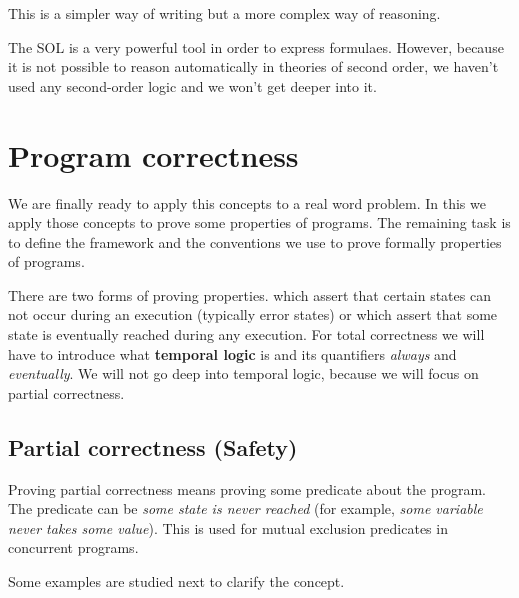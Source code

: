 This is a simpler way of writing but a more complex way of reasoning.

The \gls{SOL} is a very powerful tool in order to express formulaes. 
%
However, because it is not possible to reason automatically in theories of second order, we haven't used any second-order logic and we won't get deeper into it. 



\section{Program correctness}

We are finally ready to apply this concepts to a real word problem. In this \thisworkm we apply those concepts to prove some properties of programs.
%
The remaining task is to define the framework and the conventions we use to prove formally properties of programs.

There are two forms of proving properties. 
%
 which assert that certain states can not occur during an execution (typically error states) or 
 which assert that some state is eventually reached during any execution. 
%
For total correctness we will have to introduce what \textbf{temporal logic} is and its quantifiers \textit{always} and \textit{eventually}. 
%
We will not go deep into temporal logic, because we will focus on partial correctness.




\label{def:SPL}


\subsection{Partial correctness (Safety)}

Proving partial correctness means proving some predicate about the program.
%
The predicate can be \textit{some state is never reached} (for example, \textit{some variable never takes some value}). 
%
This is used for mutual exclusion predicates in concurrent programs.
%


Some examples are studied next to clarify the concept.

\begin{example}
\end{example}

\begin{example}
\end{example}




